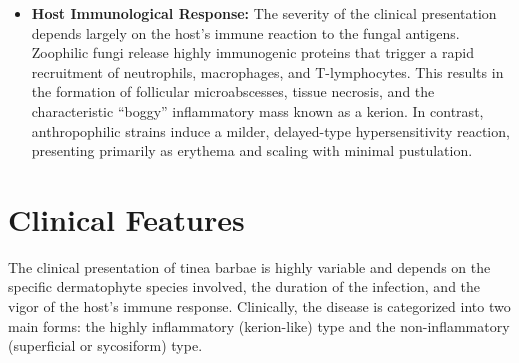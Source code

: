 \begin{itemize}
    \begin{itemize}
        \item \textit{Ectothrix invasion:} Fungal hyphae grow down the hair shaft, and arthroconidia form a sheath around the outside of the hair. The cuticle of the hair is destroyed. This pattern is characteristic of \textit{Trichophyton verrucosum} and \textit{Microsporum} species.
        \item \textit{Endothrix invasion:} Fungal hyphae and arthroconidia are restricted to the interior of the hair shaft, leaving the cuticle intact. This pattern is typical of \textit{Trichophyton violaceum}.
    \end{itemize}
    \item \textbf{Host Immunological Response:} The severity of the clinical presentation depends largely on the host's immune reaction to the fungal antigens. Zoophilic fungi release highly immunogenic proteins that trigger a rapid recruitment of neutrophils, macrophages, and T-lymphocytes. This results in the formation of follicular microabscesses, tissue necrosis, and the characteristic ``boggy'' inflammatory mass known as a kerion. In contrast, anthropophilic strains induce a milder, delayed-type hypersensitivity reaction, presenting primarily as erythema and scaling with minimal pustulation.
\end{itemize}

\section*{Clinical Features}
The clinical presentation of tinea barbae is highly variable and depends on the specific dermatophyte species involved, the duration of the infection, and the vigor of the host's immune response. Clinically, the disease is categorized into two main forms: the highly inflammatory (kerion-like) type and the non-inflammatory (superficial or sycosiform) type.


